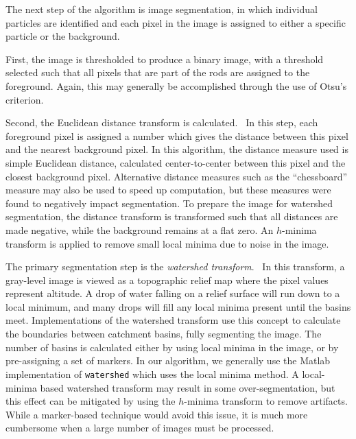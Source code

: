 The next step of the algorithm is image segmentation, in which individual particles are identified and each pixel
in the image is assigned to either a specific particle or the background. 


First, the image is thresholded to produce a binary image, with a threshold selected such that all pixels that
are part of the rods are assigned to the foreground. Again, this may generally be accomplished through the use of 
Otsu's criterion.~\cite{otsu-threshold}

Second, the Euclidean distance transform is 
calculated.~\cite{matlab-bwdist}  In this step, each foreground pixel is assigned a number which
gives the distance between this pixel and the nearest background pixel. In this algorithm, the distance measure used
is simple Euclidean distance, calculated center-to-center between this pixel and the closest background pixel.  Alternative
distance measures such as the ``chessboard'' measure may also be used to speed up computation, but these measures were
found to negatively impact segmentation.  To prepare the image for watershed segmentation, the distance 
transform is transformed such that all distances are made
negative, while the background remains at a flat zero. 
An $h$-minima transform is applied to remove small local minima
due to noise in the image.~\cite{soille-book}

The primary segmentation step is the \textit{watershed 
transform}.~\cite{matlab-watershed} In this transform, a gray-level image is viewed as
a topographic relief map where the pixel values represent altitude. A drop of water falling on a relief 
surface will run down to a local minimum, and many drops will fill any 
local minima present until the basins meet.
Implementations of the watershed transform use this concept to calculate the boundaries between catchment basins,
fully segmenting the image.  The number of basins is calculated either by using local minima in the image, or by 
pre-assigning a set of markers.  In our algorithm, we generally use the Matlab implementation of \texttt{watershed} which
uses the local minima method.  A local-minima based watershed transform may result in some 
over-segmentation, but this effect can be mitigated by using the $h$-minima transform to remove 
artifacts.  While a marker-based technique would avoid this issue, it is much more cumbersome when a large number
of images must be processed.

